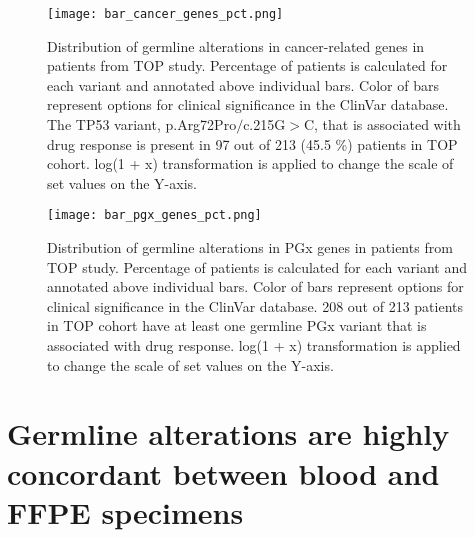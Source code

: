 
\begin{landscape}

\begin{figure}[H]
\centering
	\texttt{[image: bar\_cancer\_genes\_pct.png]}
	\caption{Distribution of germline alterations in cancer-related genes in patients from TOP study. Percentage of patients is calculated for each variant and annotated above individual bars. Color of bars represent options for clinical significance in the ClinVar database. The TP53 variant, p.Arg72Pro$/$c.215G$>$C, that is associated with drug response is present in 97 out of 213 (45.5 \%) patients in TOP cohort. log(1 + x) transformation is applied to change the scale of set values on the Y-axis.}
	\label{fig:bar_cancer_genes}
\end{figure}

\end{landscape}


\begin{landscape}

\begin{figure}[H]
\centering
	\texttt{[image: bar\_pgx\_genes\_pct.png]}
	\caption{Distribution of germline alterations in PGx genes in patients from TOP study. Percentage of patients is calculated for each variant and annotated above individual bars. Color of bars represent options for clinical significance in the ClinVar database. 208 out of 213 patients in TOP cohort have at least one germline PGx variant that is associated with drug response. log(1 + x) transformation is applied to change the scale of set values on the Y-axis.}
	\label{fig:bar_pgx_genes}
\end{figure}

\end{landscape}

\section{Germline alterations are highly concordant between blood and FFPE specimens}
\label{sec:GermlinealterationsarehighlyconcordantbetweenbloodandFFPEspecimens}

